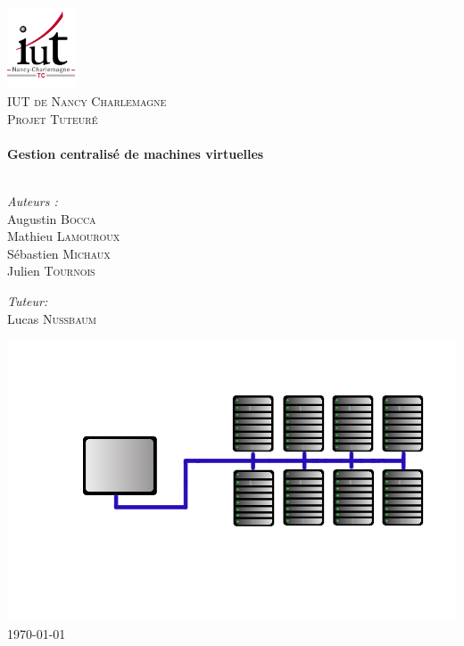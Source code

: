 \begin{titlepage}

\begin{center}


\includegraphics[width=0.15\textwidth]{images/logo_iut.png}\\[1cm]    

\textsc{\LARGE IUT de Nancy Charlemagne}\\[1.5cm]

\textsc{\Larg Projet Tuteuré}\\[0.5cm]


\HRule \\[0.4cm]
{ \huge \bfseries Gestion centralisé de machines virtuelles}\\[0.4cm]

\HRule \\[1.5cm]

\begin{minipage}{0.4\textwidth}
\begin{flushleft} \large
\emph{Auteurs :}\\
Augustin \textsc{Bocca}\\
Mathieu \textsc{Lamouroux}\\
Sébastien \textsc{Michaux}\\
Julien \textsc{Tournois}
\end{flushleft}
\end{minipage}
\begin{minipage}{0.4\textwidth}
\begin{flushright} \large
\emph{Tuteur:} \\
Lucas \textsc{Nussbaum}
\end{flushright}
\end{minipage}

\vfill
\includegraphics[width=450pt]{images/gestion_centralisee.png}\\    
{\large \today}

\end{center}

\end{titlepage}

